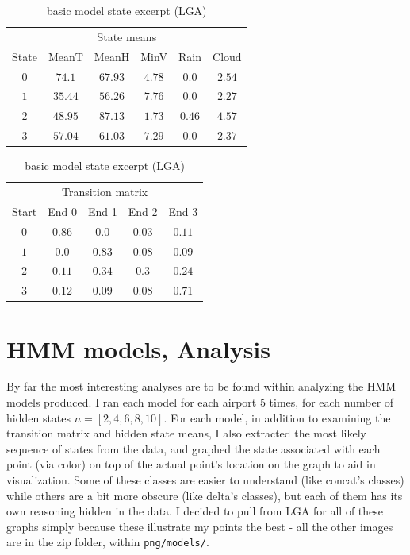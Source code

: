 \documentclass[a4paper]{article}
\begin{document}
\begin{table}[th]
  \caption{basic model state excerpt (LGA)}
  \label{tab:basic}
  \centering
  \begin{tabular}{c c c c c c}
    \toprule 
    \multicolumn{6}{c}{State means}\\
    State & MeanT & MeanH & MinV & Rain & Cloud \\
    \midrule
    $0$ & $74.1$   &  $67.93$  &  $4.78$  &  $0.0$    &   $2.54$ \\
    $1$ & $35.44$  &  $56.26$  &  $7.76$  &  $0.0$    &   $2.27$ \\
    $2$ & $48.95$  &  $87.13$  &  $1.73$  &  $0.46$   &   $4.57$ \\
    $3$ & $57.04$  &  $61.03$  &  $7.29$  &  $0.0$    &   $2.37$ \\
    \bottomrule
  \end{tabular}

  \begin{tabular}{c c c c c}
    \toprule
    \multicolumn{5}{c}{Transition matrix}\\
    Start & End 0 & End 1 & End 2 & End 3 \\
    \midrule  
    $0$ & $0.86$  &  $0.0 $  &  $0.03$  &  $0.11$ \\
    $1$ & $0.0 $  &  $0.83$  &  $0.08$  &  $0.09$ \\
    $2$ & $0.11$  &  $0.34$  &  $0.3 $  &  $0.24$ \\
    $3$ & $0.12$  &  $0.09$  &  $0.08$  &  $0.71$ \\
    \bottomrule
  \end{tabular}
\end{table} 




\section{HMM models, Analysis}

By far the most interesting analyses are to be found within analyzing the HMM models produced. I ran each model for each airport 5 times, for each number of hidden states $n=[2,4,6,8,10]$. For each model, in addition to examining the transition matrix and hidden state means, I also extracted the most likely sequence of states from the data, and graphed the state associated with each point (via color) on top of the actual point's location on the graph to aid in visualization. Some of these classes are easier to understand (like concat's classes) while others are a bit more obscure (like delta's classes), but each of them has its own reasoning hidden in the data. I decided to pull from LGA for all of these graphs simply because these illustrate my points the best - all the other images are in the zip folder, within \texttt{png/models/}.
\end{document}
